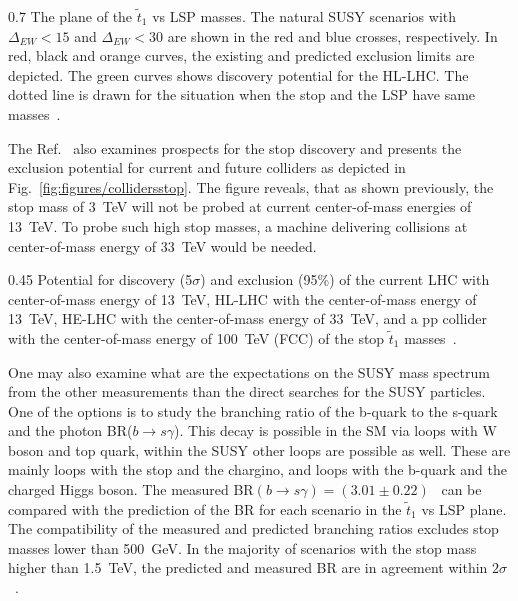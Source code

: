                  {0.7}       %
                 { The plane of the $\tilde{t}_{1}$ vs LSP masses. The natural SUSY scenarios with $\Delta_{EW} <15$ and $\Delta_{EW} <30$ are shown in the red and blue crosses, respectively. In red, black and orange curves, the existing and predicted exclusion limits are depicted. The green curves shows discovery potential for the HL-LHC. The dotted line is drawn for the situation when the stop and the LSP have same masses~\cite{Baer:2016bwh}.   }

The Ref.~\cite{Baer:2016bwh} also examines prospects for the stop discovery and presents the exclusion potential for current and future colliders as depicted in Fig.~\ref{fig:figures/collidersstop}. The figure reveals, that as shown previously, the stop mass of 3~TeV will not be probed at current center-of-mass energies of 13~TeV. To probe such high stop masses, a machine delivering collisions at center-of-mass energy of 33~TeV would be needed. 

                 {0.45}       %
                 { Potential for discovery (5$\sigma$) and exclusion (95\%) of the current LHC with center-of-mass energy of 13~TeV, HL-LHC with the center-of-mass energy of 13~TeV, HE-LHC with the center-of-mass energy of 33~TeV,  and a pp collider with the center-of-mass energy of 100~TeV (FCC) of the stop $\tilde{t}_{1}$ masses~\cite{Baer:2016bwh}.  }


One may also examine what are the expectations on the SUSY mass spectrum from the other measurements than the direct searches for the SUSY particles. One of the options is to study the branching ratio of the b-quark to the s-quark and the photon BR($b \to s\gamma$).  This decay is possible in the SM via loops with W boson and top quark, within the SUSY other loops are possible as well. These are mainly loops with the  stop and the chargino, and loops with the b-quark and the charged Higgs boson. The measured BR$(b \to s\gamma) = (3.01 \pm 0.22)$~\cite{Belle:2016ufb} can be compared with the prediction of the BR for each scenario in the $\tilde{t}_{1}$ vs LSP plane. The compatibility of the measured and predicted branching ratios excludes stop masses lower than 500~GeV. In the majority of scenarios with the stop mass higher than 1.5~TeV, the predicted and measured BR are in agreement within $2\sigma$~\cite{Baer:2016bwh}.


